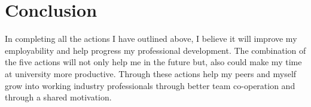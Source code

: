 \documentclass{scrartcl}
\begin{document}
\section{Conclusion}
In completing all the actions I have outlined above, I believe it will improve my employability and help progress my professional development. The combination of the five actions will not only help me in the future but, also could make my time at university more productive. Through these actions help my peers and myself grow into working industry professionals through better team co-operation and through a shared motivation.




\end{document}
